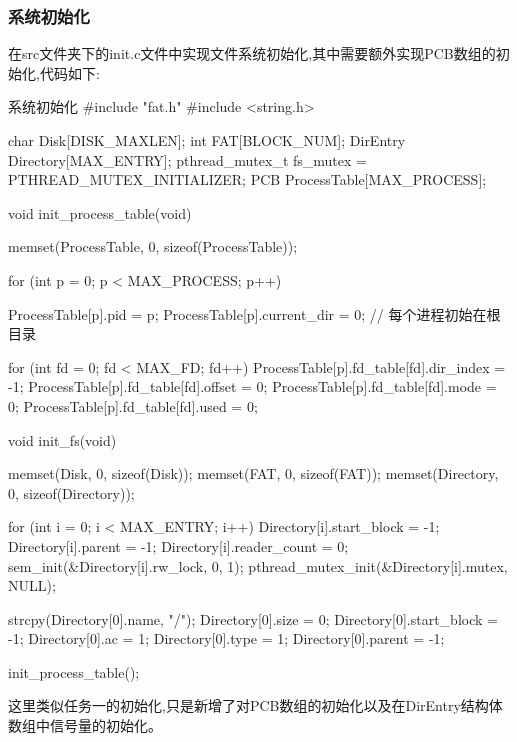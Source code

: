 \subsubsection{系统初始化}
在src文件夹下的init.c文件中实现文件系统初始化,其中需要额外实现PCB数组的初始化,代码如下:
\begin{ccode}{系统初始化}
#include "fat.h"
#include <string.h>

char Disk[DISK_MAXLEN];
int FAT[BLOCK_NUM];
DirEntry Directory[MAX_ENTRY];
pthread_mutex_t fs_mutex = PTHREAD_MUTEX_INITIALIZER;
PCB ProcessTable[MAX_PROCESS];

void init_process_table(void)
{
    memset(ProcessTable, 0, sizeof(ProcessTable));

    for (int p = 0; p < MAX_PROCESS; p++) {
        ProcessTable[p].pid = p;
        ProcessTable[p].current_dir = 0;   // 每个进程初始在根目录

        for (int fd = 0; fd < MAX_FD; fd++) {
            ProcessTable[p].fd_table[fd].dir_index = -1;
            ProcessTable[p].fd_table[fd].offset = 0;
            ProcessTable[p].fd_table[fd].mode = 0;
            ProcessTable[p].fd_table[fd].used = 0;
        }
    }
}
void init_fs(void)
{
    memset(Disk, 0, sizeof(Disk));
    memset(FAT, 0, sizeof(FAT));
    memset(Directory, 0, sizeof(Directory));

    for (int i = 0; i < MAX_ENTRY; i++) {
        Directory[i].start_block = -1;
        Directory[i].parent = -1;
        Directory[i].reader_count = 0;
        sem_init(&Directory[i].rw_lock, 0, 1);
        pthread_mutex_init(&Directory[i].mutex, NULL);
    }

    strcpy(Directory[0].name, "/");
    Directory[0].size = 0;
    Directory[0].start_block = -1;
    Directory[0].ac = 1;
    Directory[0].type = 1;
    Directory[0].parent = -1;

    init_process_table();
}
\end{ccode}
这里类似任务一的初始化,只是新增了对PCB数组的初始化以及在DirEntry结构体数组中信号量的初始化。